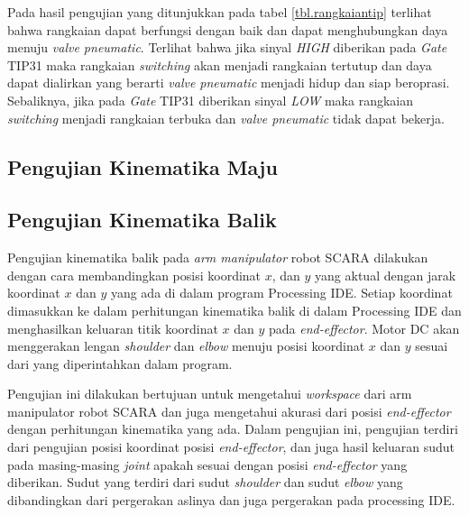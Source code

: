 Pada hasil pengujian yang ditunjukkan pada tabel \ref{tbl.rangkaiantip} terlihat bahwa rangkaian dapat berfungsi dengan baik dan dapat menghubungkan daya menuju \textit{valve pneumatic}. Terlihat bahwa jika sinyal \textit{HIGH} diberikan pada \textit{Gate} TIP31 maka rangkaian \textit{switching} akan menjadi rangkaian tertutup dan daya dapat dialirkan yang berarti \textit{valve pneumatic} menjadi hidup dan siap beroprasi. Sebaliknya, jika pada \textit{Gate} TIP31 diberikan sinyal \textit{LOW} maka rangkaian \textit{switching} menjadi rangkaian terbuka dan \textit{valve pneumatic} tidak dapat bekerja.

\subsection{Pengujian Kinematika Maju}


\subsection{Pengujian Kinematika Balik}
Pengujian kinematika balik pada \textit{arm manipulator} robot SCARA dilakukan dengan cara membandingkan posisi koordinat $x$, dan $y$ yang aktual dengan jarak koordinat $x$ dan $y$ yang ada di dalam program Processing IDE. Setiap koordinat dimasukkan ke dalam perhitungan kinematika balik di dalam Processing IDE dan menghasilkan keluaran titik koordinat $x$ dan $y$ pada \textit{end-effector}. Motor DC akan menggerakan lengan \textit{shoulder} dan \textit{elbow} menuju posisi koordinat $x$ dan $y$ sesuai dari yang diperintahkan dalam program.

 Pengujian ini dilakukan bertujuan untuk mengetahui \textit{workspace} dari arm manipulator robot SCARA dan juga mengetahui akurasi dari posisi \textit{end-effector} dengan perhitungan kinematika yang ada.
Dalam pengujian ini, pengujian terdiri dari pengujian posisi koordinat posisi \textit{end-effector}, dan juga hasil keluaran sudut pada masing-masing \textit{joint} apakah sesuai dengan posisi \textit{end-effector} yang diberikan. Sudut yang terdiri dari sudut \textit{shoulder} dan sudut \textit{elbow} yang dibandingkan dari pergerakan aslinya dan juga pergerakan pada processing IDE.  

